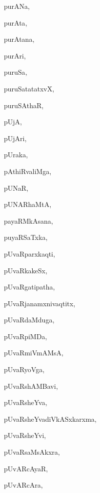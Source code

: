 \begin{multicols}{3}
{\noindent
{purANa}, \pageref{purANa}

\noindent
{purAta}, \pageref{purAta}

\noindent
{purAtana}, \pageref{purAtana}

\noindent
{purAri}, \pageref{purAri}

\noindent
{puruSa}, \pageref{puruSa}

\noindent
{puruSatatatxvX}, \pageref{puruSatatatxvX}

\noindent
{puruSAthaR}, \pageref{puruSAthaR}

\noindent
{pUjA}, \pageref{pUjA}

\noindent
{pUjAri}, \pageref{pUjAri}

\noindent
{pUraka}, \pageref{pUraka}

\noindent
{pAthiRvaliMga}, \pageref{pAthiRvaliMga}

\noindent
{pUNaR}, \pageref{pUNaR}

\noindent
{pUNARhaMtA}, \pageref{pUNARhaMtA}

\noindent
{payaRMkAsana}, \pageref{payaRMkAsana}

\noindent
{puyaRSaTxka}, \pageref{puyaRSaTxka}

\noindent
{pUvaRparxkaqti}, \pageref{pUvaRparxkaqti}

\noindent
{pUvaRkakeSx}, \pageref{pUvaRkakeSx}

\noindent
{pUvaRgatipatha}, \pageref{pUvaRgatipatha}

\noindent
{pUvaRjanamxnivaqtitx}, \pageref{pUvaRjanamxnivaqtitx}

\noindent
{pUvaRdaMduga}, \pageref{pUvaRdaMduga}

\noindent
{pUvaRpiMDa}, \pageref{pUvaRpiMDa}

\noindent
{pUvaRmiVmAMsA}, \pageref{pUvaRmiVmAMsA}

\noindent
{pUvaRyoVga}, \pageref{pUvaRyoVga}

\noindent
{pUvaRshAMBavi}, \pageref{pUvaRshAMBavi}

\noindent
{pUvaRsheYva}, \pageref{pUvaRsheYva}

\noindent
{pUvaRsheYvadiVkASxkarxma}, \pageref{pUvaRsheYvadiVkASxkarxma}

\noindent
{pUvaRsheYvi}, \pageref{pUvaRsheYvi}

\noindent
{pUvaRsaMsAkxra}, \pageref{pUvaRsaMsAkxra}

\noindent
{pUvARcAyaR}, \pageref{pUvARcAyaR}

\noindent
{pUvARcAra}, \pageref{pUvARcAra}

}
\end{multicols}
